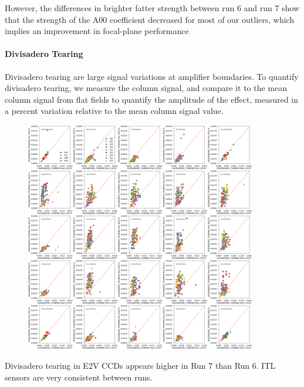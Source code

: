 However, the differences in brighter fatter strength between run 6 and
run 7 show that the strength of the A{00} coefficient decreased for most
of our outliers, which implies an improvement in focal-plane performance

\paragraph{Divisadero Tearing}\label{divisadero-tearing}

Divisadero tearing are large signal variations at amplifier boundaries.
To quantify divisadero tearing, we measure the column signal, and
compare it to the mean column signal from flat fields to quantify the
amplitude of the effect, measured in a percent variation relative to the
mean column signal value.

\begin{figure}
\begin{centering}
\includegraphics[width=0.9\textwidth]{sections/figures/baselineCharacterization/13557_E1071_DIVISADERO_TEARING.png}
\end{centering}
\end{figure}

Divisadero tearing in E2V CCDs appears higher in Run 7 than Run 6. ITL
sensors are very consistent between runs.

